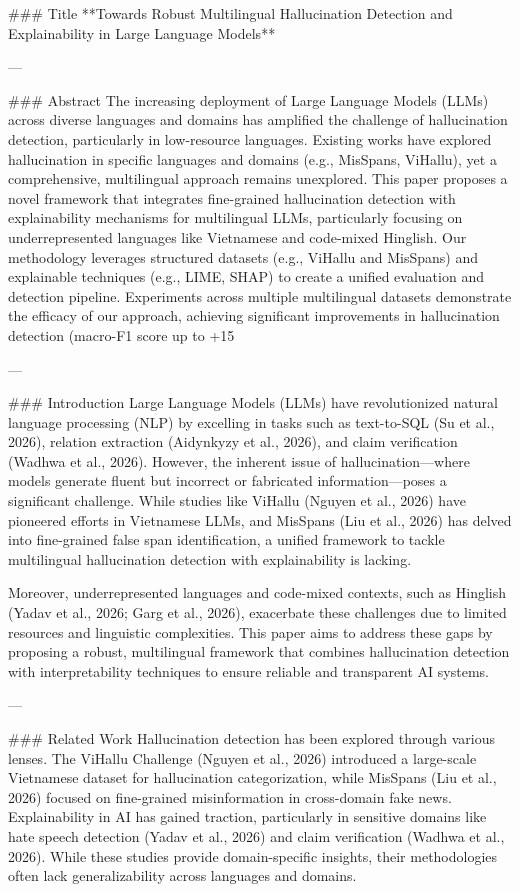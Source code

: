 ### Title  
**Towards Robust Multilingual Hallucination Detection and Explainability in Large Language Models**

---

### Abstract  
The increasing deployment of Large Language Models (LLMs) across diverse languages and domains has amplified the challenge of hallucination detection, particularly in low-resource languages. Existing works have explored hallucination in specific languages and domains (e.g., MisSpans, ViHallu), yet a comprehensive, multilingual approach remains unexplored. This paper proposes a novel framework that integrates fine-grained hallucination detection with explainability mechanisms for multilingual LLMs, particularly focusing on underrepresented languages like Vietnamese and code-mixed Hinglish. Our methodology leverages structured datasets (e.g., ViHallu and MisSpans) and explainable techniques (e.g., LIME, SHAP) to create a unified evaluation and detection pipeline. Experiments across multiple multilingual datasets demonstrate the efficacy of our approach, achieving significant improvements in hallucination detection (macro-F1 score up to +15%

---

### Introduction  
Large Language Models (LLMs) have revolutionized natural language processing (NLP) by excelling in tasks such as text-to-SQL (Su et al., 2026), relation extraction (Aidynkyzy et al., 2026), and claim verification (Wadhwa et al., 2026). However, the inherent issue of hallucination—where models generate fluent but incorrect or fabricated information—poses a significant challenge. While studies like ViHallu (Nguyen et al., 2026) have pioneered efforts in Vietnamese LLMs, and MisSpans (Liu et al., 2026) has delved into fine-grained false span identification, a unified framework to tackle multilingual hallucination detection with explainability is lacking.

Moreover, underrepresented languages and code-mixed contexts, such as Hinglish (Yadav et al., 2026; Garg et al., 2026), exacerbate these challenges due to limited resources and linguistic complexities. This paper aims to address these gaps by proposing a robust, multilingual framework that combines hallucination detection with interpretability techniques to ensure reliable and transparent AI systems.

---

### Related Work  
Hallucination detection has been explored through various lenses. The ViHallu Challenge (Nguyen et al., 2026) introduced a large-scale Vietnamese dataset for hallucination categorization, while MisSpans (Liu et al., 2026) focused on fine-grained misinformation in cross-domain fake news. Explainability in AI has gained traction, particularly in sensitive domains like hate speech detection (Yadav et al., 2026) and claim verification (Wadhwa et al., 2026). While these studies provide domain-specific insights, their methodologies often lack generalizability across languages and domains.

